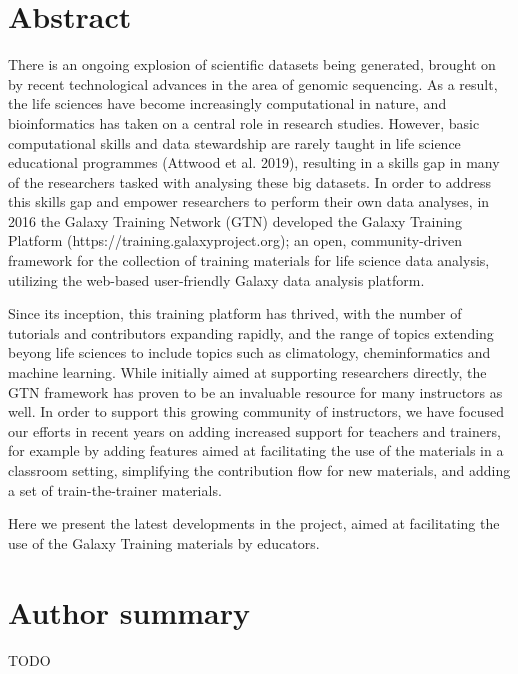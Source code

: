 \documentclass[10pt,letterpaper]{article}
\begin{document}
\section*{Abstract}
There is an ongoing explosion of scientific datasets being generated, brought on by recent technological advances in the area of genomic sequencing. As a result, the life sciences have become increasingly computational in nature, and bioinformatics has taken on a central role in research studies. However, basic computational skills and data stewardship are rarely taught in life science educational programmes (Attwood et al. 2019), resulting in a skills gap in many of the researchers tasked with analysing these big datasets. In order to address this skills gap and empower researchers to perform their own data analyses, in 2016 the Galaxy Training Network (GTN) developed the Galaxy Training Platform (https://training.galaxyproject.org); an open, community-driven framework for the collection of training materials for life science data analysis, utilizing the web-based user-friendly Galaxy data analysis platform.

Since its inception, this training platform has thrived, with the number of tutorials and contributors expanding rapidly, and the range of topics extending beyong life sciences to include topics such as climatology, cheminformatics and machine learning. While initially aimed at supporting researchers directly, the GTN framework has proven to be an invaluable resource for many instructors as well. In order to support this growing community of instructors, we have focused our efforts in recent years on adding increased support for teachers and trainers, for example by adding features aimed at facilitating the use of the materials in a classroom setting, simplifying the contribution flow for new materials, and adding a set of train-the-trainer materials.

Here we present the latest developments in the project, aimed at facilitating the use of the Galaxy Training materials by educators.


\section*{Author summary}

TODO
\end{document}

